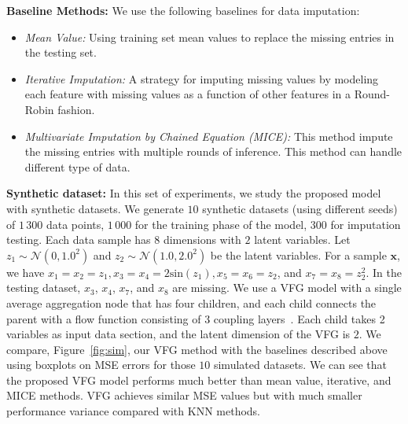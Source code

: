 \documentclass[twoside]{article}
\begin{document}
\textbf{Baseline Methods:} We use the following baselines for data imputation:%
\begin{itemize}
\item \textit{Mean Value:} Using training set mean values to replace the missing entries in the testing set.   
\item \textit{Iterative Imputation:} A strategy for imputing missing values by modeling each feature with missing values as a function of other features in a Round-Robin fashion.   
\item \textit{Multivariate Imputation by Chained Equation (MICE):} This method impute the missing entries with multiple  rounds of inference. This method can handle different type of data.
\end{itemize}  

\textbf{Synthetic dataset: } In this set of experiments, we study the proposed model with synthetic datasets.
We generate $10$ synthetic datasets (using different seeds) of $1\,300$ data points, $1\,000$ for the training phase of the model, $300$ for imputation testing. 
Each data sample  has $8$ dimensions with $2$ latent variables. 
Let $z_1 \sim \mathcal{N}(0,1.0^2)$ and $z_2 \sim  \mathcal{N}(1.0,2.0^2)$ be the latent variables. For a sample $\mathbf{x}$, we have  $x_1=x_2 = z_1, x_3=x_4= 2\textrm{sin}(z_1), x_5=x_6 =z_2$, and $x_7= x_8 = z_2^2$.  In the testing dataset, $x_3$, $x_4$, $x_7$, and $x_8$ are missing. We use a VFG model with a single average aggregation node that has four children, and each child connects the parent with a flow function consisting of 3 coupling layers~\cite{Dinh2016DensityEU}. 
Each child takes 2 variables as input data section, and the latent dimension of the VFG is $2$.
We compare, Figure~\ref{fig:sim}, our VFG method with the baselines described above using boxplots on MSE errors for those $10$ simulated datasets.
We can see that the proposed VFG model performs much better than mean value, iterative, and MICE methods. 
VFG achieves similar MSE values but with much smaller performance variance compared with KNN methods.  
\end{document}
